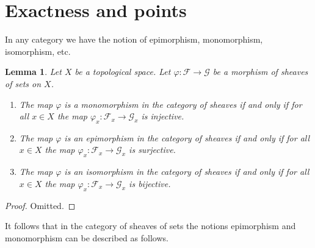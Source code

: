 \documentclass{stacks-project}
\theoremstyle{plain}
\newtheorem{lemma}[subsection]{Lemma}
\theoremstyle{definition}
\theoremstyle{remark}
\numberwithin{equation}{subsection}
\begin{document}
\section{Exactness and points}
\label{section-exactness-points}

\noindent
In any category we have the notion of epimorphism, monomorphism,
isomorphism, etc.

\begin{lemma}
\label{lemma-points-exactness}
Let $X$ be a topological space. Let $\varphi : \mathcal{F} \to \mathcal{G}$
be a morphism of sheaves of sets on $X$.
\begin{enumerate}
\item The map $\varphi$ is a monomorphism in the category of sheaves
if and only if for all $x \in X$ the map
$\varphi_x : \mathcal{F}_x \to \mathcal{G}_x$
is injective.
\item The map $\varphi$ is an epimorphism in the category of sheaves
if and only if for all $x \in X$ the map
$\varphi_x : \mathcal{F}_x \to \mathcal{G}_x$
is surjective.
\item The map $\varphi$ is an isomorphism in the category of sheaves
if and only if for all $x \in X$ the map
$\varphi_x : \mathcal{F}_x \to \mathcal{G}_x$
is bijective.
\end{enumerate}
\end{lemma}

\begin{proof}
Omitted.
\end{proof}

\noindent
It follows that in the category of sheaves of sets
the notions epimorphism and monomorphism can be described
as follows.
\end{document}
